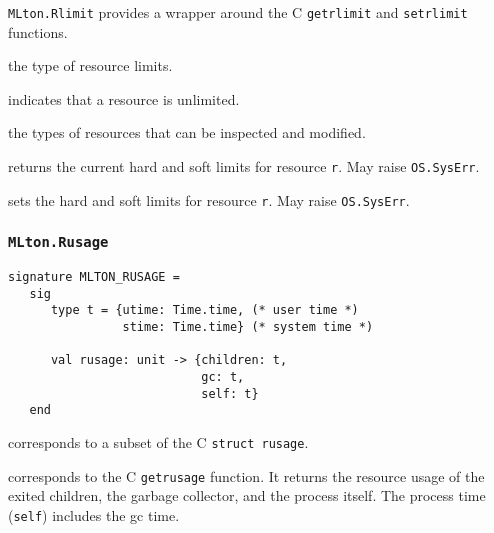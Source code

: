 {\tt MLton.Rlimit} provides a wrapper around the C {\tt getrlimit} and
{\tt setrlimit} functions.

\begin{description}
the type of resource limits.

indicates that a resource is unlimited.

the types of resources that can be inspected and modified.

returns the current hard and soft limits for resource {\tt r}. May
raise {\tt OS.SysErr}.

sets the hard and soft limits for resource {\tt r}.  May raise {\tt OS.SysErr}.
\end{description}
%
\subsubsection{\tt MLton.Rusage}

\begin{verbatim}
signature MLTON_RUSAGE =
   sig
      type t = {utime: Time.time, (* user time *)
                stime: Time.time} (* system time *)
         
      val rusage: unit -> {children: t,
                           gc: t,
                           self: t}
   end
\end{verbatim}

\begin{description}
corresponds to a subset of the C {\tt struct rusage}.

corresponds to the C {\tt getrusage} function.  It returns the
resource usage of the exited children, the garbage collector, and the
process itself.  The process time ({\tt self}) includes the gc time.
\end{description}


